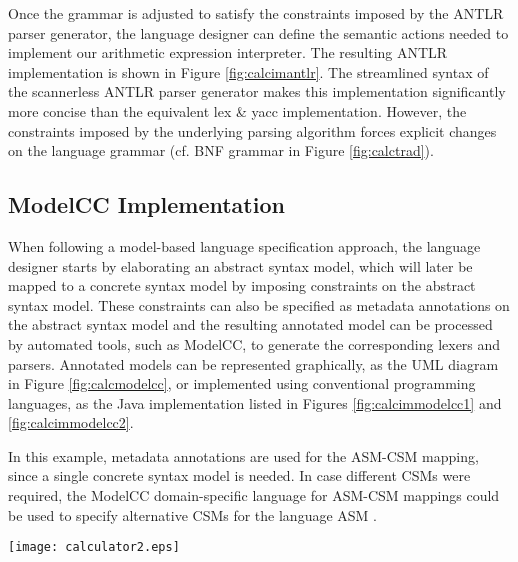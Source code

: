\documentclass[preprint]{elsarticle}
\begin{document}
Once the grammar is adjusted to satisfy the constraints imposed by the ANTLR parser generator, the language designer can define the semantic actions needed to implement our arithmetic expression interpreter.
The resulting ANTLR implementation is shown in Figure \ref{fig:calcimantlr}.
The streamlined syntax of the scannerless ANTLR parser generator makes this implementation significantly more concise than the equivalent lex \& yacc implementation.
However, the constraints imposed by the underlying parsing algorithm forces explicit changes on the language grammar (cf. BNF grammar in Figure \ref{fig:calctrad}).

\subsection{ModelCC Implementation}

When following a model-based language specification approach, the language designer starts by elaborating an abstract syntax model, which will later be mapped to a concrete syntax model by imposing constraints on the abstract syntax model.
These constraints can also be specified as metadata annotations on the abstract syntax model and the resulting annotated model can be processed by automated tools, such as ModelCC, to generate the corresponding lexers and parsers.
Annotated models can be represented graphically, as the UML diagram in Figure \ref{fig:calcmodelcc}, or implemented using conventional programming languages, as the Java implementation listed in Figures \ref{fig:calcimmodelcc1} and \ref{fig:calcimmodelcc2}.

In this example, metadata annotations are used for the ASM-CSM mapping, since a single concrete syntax model is needed.
In case different CSMs were required, the ModelCC domain-specific language for ASM-CSM mappings could be used to specify alternative CSMs for the language ASM \cite{Quesada2014b}.

\begin{figure*}[tb!]
\centering
\texttt{[image: calculator2.eps]}
\caption{ModelCC specification of the arithmetic expression language.} \label{fig:calcmodelcc}
\end{figure*}
\end{document}
